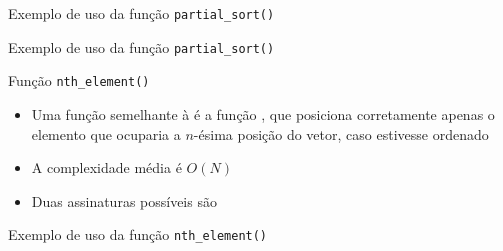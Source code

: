 \begin{frame}[fragile]{Exemplo de uso da função \texttt{partial\_sort()}}
\end{frame}

\begin{frame}[fragile]{Exemplo de uso da função \texttt{partial\_sort()}}
\end{frame}

\begin{frame}[fragile]{Função \texttt{nth\_element()}}

    \begin{itemize}
        \item Uma função semelhante à  é a função 
            , que posiciona corretamente apenas o elemento que
            ocuparia a $n$-ésima posição do vetor, caso estivesse ordenado

        \item A complexidade média é $O(N)$

        \item Duas assinaturas possíveis são

    \end{itemize}

\end{frame}

\begin{frame}[fragile]{Exemplo de uso da função \texttt{nth\_element()}}
\end{frame}
